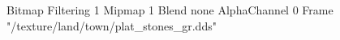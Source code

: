 {Bitmap
	{Filtering 1}
	{Mipmap 1}
	{Blend none}
	{AlphaChannel 0}
	{Frame "/texture/land/town/plat_stones_gr.dds"}
}
